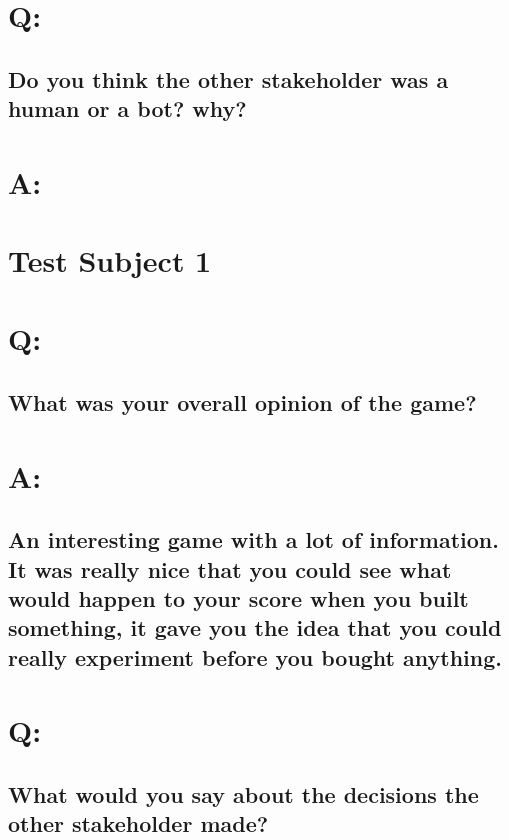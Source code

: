 \section*{Q:}
\subsection*{Do you think the other stakeholder was a human or a bot? why?}

\section*{A:}
\subsection*{}

\newpage
\section*{Test Subject 1}

\section*{Q:}
\subsection*{What was your overall opinion of the game?}

\section*{A:}

\subsection*{An interesting game with a lot of information. It was really nice that you could see what would happen to your score when you built something, it gave you the idea that you could really experiment before you bought anything.}

\section*{Q:} 
\subsection*{What would you say about the decisions the other stakeholder made?}

